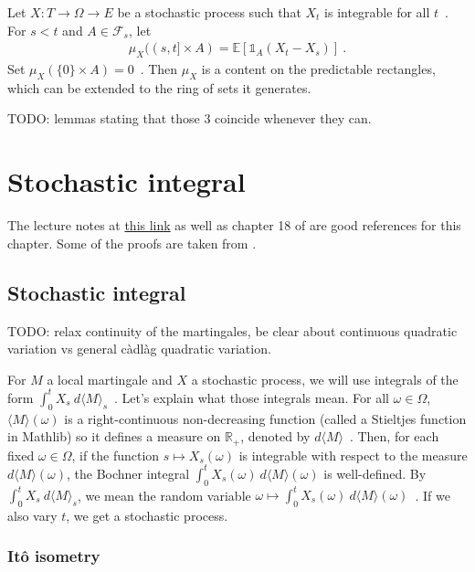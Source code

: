 Let $X : T \to \Omega \to E$ be a stochastic process such that $X_t$ is integrable for all $t$~.
For $s < t$ and $A \in \mathcal{F}_s$, let
\begin{align*}
  \mu_X((s, t] \times A) = \mathbb{E}[\mathbb{1}_A (X_t - X_s)]
  \: .
\end{align*}
Set $\mu_X(\{0\} \times A) = 0$~.
Then $\mu_X$ is a content on the predictable rectangles, which can be extended to the ring of sets it generates.

TODO: lemmas stating that those 3 coincide whenever they can.


\chapter{Stochastic integral}

The lecture notes at \href{https://dec41.user.srcf.net/h/III_L/stochastic_calculus_and_applications/}{this link} as well as chapter 18 of \cite{kallenberg2021} are good references for this chapter.
Some of the proofs are taken from \cite{pascucci2024}.





\section{Stochastic integral}

TODO: relax continuity of the martingales, be clear about continuous quadratic variation vs general càdlàg quadratic variation.

For $M$ a local martingale and $X$ a stochastic process, we will use integrals of the form $\int_0^t X_s \: d\langle M \rangle_s$~.
Let's explain what those integrals mean. For all $\omega \in \Omega$, $\langle M \rangle(\omega)$ is a right-continuous non-decreasing function (called a Stieltjes function in Mathlib) so it defines a measure on $\mathbb{R}_+$, denoted by $d\langle M \rangle$~.
Then, for each fixed $\omega \in \Omega$, if the function $s \mapsto X_s(\omega)$ is integrable with respect to the measure $d\langle M \rangle(\omega)$, the Bochner integral $\int_0^t X_s(\omega) \: d\langle M \rangle(\omega)$ is well-defined.
By $\int_0^t X_s \: d\langle M \rangle_s$, we mean the random variable $\omega \mapsto \int_0^t X_s(\omega) \: d\langle M \rangle(\omega)$~.
If we also vary $t$, we get a stochastic process.



\subsection{Itô isometry}


